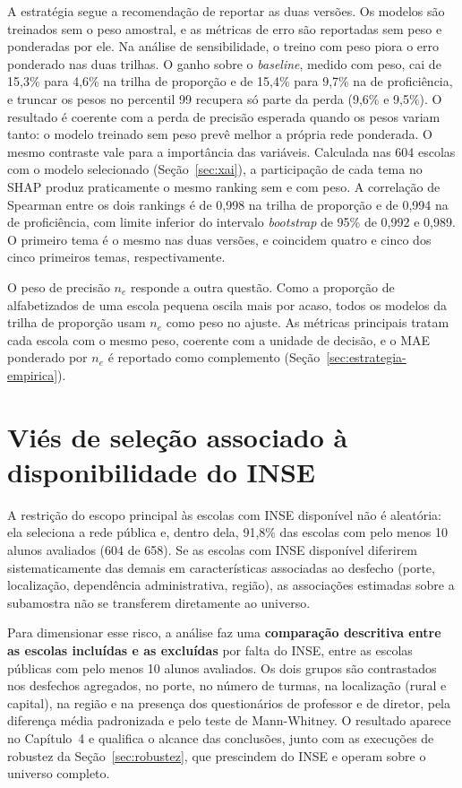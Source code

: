 A estratégia segue a recomendação de reportar as duas versões. Os modelos
são treinados sem o peso amostral, e as métricas de erro são reportadas sem
peso e ponderadas por ele. Na análise de sensibilidade, o treino com peso
piora o erro ponderado nas duas trilhas. O ganho sobre o \textit{baseline},
medido com peso, cai de 15,3\% para 4,6\% na trilha de proporção e de
15,4\% para 9,7\% na de proficiência, e truncar os pesos no percentil 99
recupera só parte da perda (9,6\% e 9,5\%). O resultado é coerente com a
perda de precisão esperada quando os pesos variam tanto: o modelo treinado
sem peso prevê melhor a própria rede ponderada. O mesmo contraste vale para
a importância das variáveis. Calculada nas 604 escolas com o modelo
selecionado (Seção~\ref{sec:xai}), a participação de cada tema no SHAP
produz praticamente o mesmo ranking sem e com peso. A correlação de
Spearman entre os dois rankings é de 0,998 na trilha de proporção e de
0,994 na de proficiência, com limite inferior do intervalo \textit{bootstrap}
de 95\% de 0,992 e 0,989. O primeiro tema é o mesmo nas duas versões, e
coincidem quatro e cinco dos cinco primeiros temas, respectivamente.

O peso de precisão $n_e$ responde a outra questão. Como a proporção de
alfabetizados de uma escola pequena oscila mais por acaso, todos os modelos
da trilha de proporção usam $n_e$ como peso no ajuste. As métricas
principais tratam cada escola com o mesmo peso, coerente com a unidade de
decisão, e o MAE ponderado por $n_e$ é reportado como complemento
(Seção~\ref{sec:estrategia-empirica}).

\section{Viés de seleção associado à disponibilidade do INSE}
\label{sec:vies-inse}

A restrição do escopo principal às escolas com INSE disponível não é
aleatória: ela seleciona a rede pública e, dentro dela, 91,8\% das escolas
com pelo menos 10 alunos avaliados (604 de 658). Se as escolas com INSE
disponível diferirem sistematicamente
das demais em características associadas ao desfecho (porte, localização,
dependência administrativa, região), as associações estimadas sobre a
subamostra não se transferem diretamente ao universo.

Para dimensionar esse risco, a análise faz uma \textbf{comparação
descritiva entre as escolas incluídas e as excluídas} por falta do INSE,
entre as escolas públicas com pelo menos 10 alunos avaliados. Os dois
grupos são contrastados nos desfechos agregados, no porte, no número de
turmas, na localização (rural e capital), na região e na presença dos
questionários de professor e de diretor, pela diferença média padronizada e
pelo teste de Mann-Whitney. O resultado aparece no Capítulo~4 e qualifica o
alcance das conclusões, junto com as execuções de robustez da
Seção~\ref{sec:robustez}, que prescindem do INSE e operam sobre o universo
completo.

